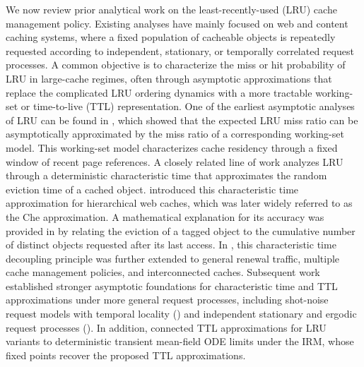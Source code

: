 \documentclass{article}
\theoremstyle{definition}
\begin{document}
We now review prior analytical work on the least-recently-used (LRU) cache management policy. Existing analyses have mainly focused on web and content caching systems, where a fixed population of cacheable objects is repeatedly requested according to independent, stationary, or temporally correlated request processes. A common objective is to characterize the miss or hit probability of LRU in large-cache regimes, often through asymptotic approximations that replace the complicated LRU ordering dynamics with a more tractable working-set or time-to-live (TTL) representation. One of the earliest asymptotic analyses of LRU can be found in \cite{fagin1977asymptotic}, which showed that the expected LRU miss ratio can be asymptotically approximated by the miss ratio of a corresponding working-set model. This working-set model characterizes cache residency through a fixed window of recent page references. A closely related line of work analyzes LRU through a deterministic characteristic time that approximates the random eviction time of a cached object. \citet{che2002hierarchical} introduced this characteristic time approximation for hierarchical web caches, which was later widely referred to as the Che approximation. A mathematical explanation for its accuracy was provided in \cite{fricker2012versatile} by relating the eviction of a tagged object to the cumulative number of distinct objects requested after its last access. In \cite{martina2014unified}, this characteristic time decoupling principle was further extended to general renewal traffic, multiple cache management policies, and interconnected caches. Subsequent work established stronger asymptotic foundations for characteristic time and TTL approximations under more general request processes, including shot-noise request models with temporal locality (\cite{leonardi2017modeling}) and independent stationary and ergodic request processes (\cite{jiang2018convergence}). In addition, \citet{gast2017ttl} connected TTL approximations for LRU variants to deterministic transient mean-field ODE limits under the IRM, whose fixed points recover the proposed TTL approximations.
\end{document}

